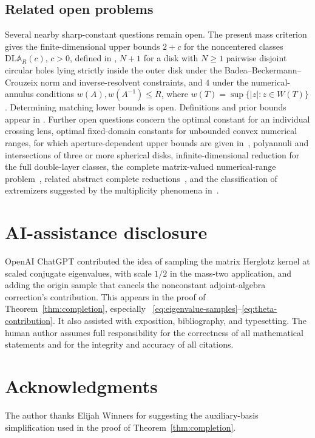 \documentclass[preprints,article,submit,oneauthor]{Definitions/mdpi}
\theoremstyle{mdpi}
\theoremstyle{definition}
\begin{document}
\subsection{Related open problems}

Several nearby sharp-constant questions remain open.  The present mass
criterion gives the finite-dimensional upper bounds $2+c$ for the
noncentered classes $\mathrm{DL}\mathbb A_R(c)$, $c>0$, defined in
\cite{JuryTsikalas2024}, $N+1$ for a disk with $N\geq1$
pairwise disjoint circular holes lying strictly inside the outer disk
under the Badea--Beckermann--Crouzeix norm and inverse-resolvent
constraints, and $4$ under the numerical-annulus
conditions $w(A),w(A^{-1})\leq R$, where
$w(T)=\sup\{\lvert z\rvert:z\in W(T)\}$.  Determining matching lower
bounds is open.  Definitions and prior bounds appear in
\cite{BadeaBeckermannCrouzeix2009,
TsikalasMultiplyConnected2026,CrouzeixAnnuli2025}.
Further open questions concern the optimal constant for an individual
crossing lens, optimal fixed-domain constants for unbounded convex
numerical ranges, for which aperture-dependent upper bounds are given
in~\cite{CrouzeixUnbounded2025}, polyannuli and intersections of
three or more spherical disks, infinite-dimensional reduction for the
full double-layer classes, the complete matrix-valued numerical-range
problem~\cite{DavidsonPaulsenWoerdeman2018}, related abstract complete
reductions~\cite{HartzMcCarthy2026}, and the classification of
extremizers suggested by the multiplicity phenomena in~\cite{Li2020}.

\section*{AI-assistance disclosure}

OpenAI ChatGPT contributed the idea of sampling the matrix Herglotz
kernel at scaled conjugate eigenvalues, with scale $1/2$ in the
mass-two application, and adding the origin sample that cancels the
nonconstant adjoint-algebra correction's contribution.  This appears
in the proof of Theorem~\ref{thm:completion}, especially~%
\eqref{eq:eigenvalue-samples}--\eqref{eq:theta-contribution}.  It also
assisted with exposition, bibliography, and typesetting.  The human
author assumes full responsibility for the correctness of all
mathematical statements and for the integrity and accuracy of all
citations.

\section*{Acknowledgments}

The author thanks Elijah Winners for suggesting the auxiliary-basis
simplification used in the proof of
Theorem~\ref{thm:completion}.


\end{document}
